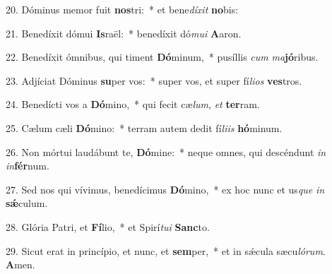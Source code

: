 20. Dóminus memor fuit \textbf{nos}tri:~*  et bene\textit{dí}\textit{xit} \textbf{no}bis:\

21. Benedíxit dómui \textbf{Is}raël:~*  benedíxit dó\textit{mu}\textit{i} \textbf{A}aron.\

22. Benedíxit ómnibus, qui timent \textbf{Dó}minum,~*  pusíllis \textit{cum} \textit{ma}\textbf{jó}ribus.\

23. Adjíciat Dóminus \textbf{su}per vos:~*  super vos, et super fí\textit{li}\textit{os} \textbf{ves}tros.\

24. Benedícti vos a \textbf{Dó}mino,~*  qui fecit cæ\textit{lum}, \textit{et} \textbf{ter}ram.\

25. Cælum cæli \textbf{Dó}mino:~*  terram autem dedit fí\textit{li}\textit{is} \textbf{hó}minum.\

26. Non mórtui laudábunt te, \textbf{Dó}mine:~*  neque omnes, qui descéndunt \textit{in} \textit{in}\textbf{fér}num.\

27. Sed nos qui vívimus, benedícimus \textbf{Dó}mino,~*  ex hoc nunc et us\textit{que} \textit{in} \textbf{sǽ}culum.\

28. Glória Patri, et \textbf{Fí}lio,~*  et Spirí\textit{tu}\textit{i} \textbf{Sanc}to.\

29. Sicut erat in princípio, et nunc, et \textbf{sem}per,~*  et in sǽcula sæcu\textit{ló}\textit{rum}. \textbf{A}men.\

